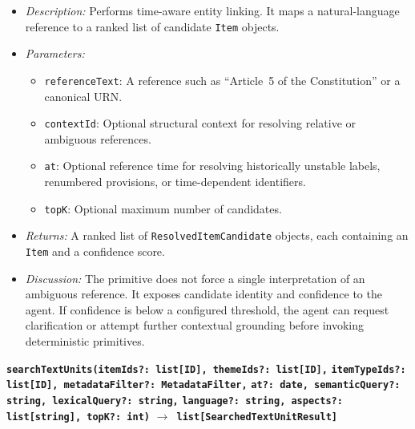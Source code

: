 \documentclass[11pt]{article}
\begin{document}
\begin{itemize}
    \item \textit{Description:} Performs time-aware entity linking. It maps a natural-language reference to a ranked list of candidate \texttt{Item} objects.
    \item \textit{Parameters:}
    \begin{itemize}
        \item \texttt{referenceText}: A reference such as ``Article~5 of the Constitution'' or a canonical URN.
        \item \texttt{contextId}: Optional structural context for resolving relative or ambiguous references.
        \item \texttt{at}: Optional reference time for resolving historically unstable labels, renumbered provisions, or time-dependent identifiers.
        \item \texttt{topK}: Optional maximum number of candidates.
    \end{itemize}
    \item \textit{Returns:} A ranked list of \texttt{ResolvedItemCandidate} objects, each containing an \texttt{Item} and a confidence score.
    \item \textit{Discussion:} The primitive does not force a single interpretation of an ambiguous reference. It exposes candidate identity and confidence to the agent. If confidence is below a configured threshold, the agent can request clarification or attempt further contextual grounding before invoking deterministic primitives.
\end{itemize}

\vspace{0.3cm}
\noindent\textbf{\texttt{searchTextUnits(itemIds?: list[ID], themeIds?: list[ID],}} \newline
\textbf{\texttt{itemTypeIds?: list[ID], metadataFilter?: MetadataFilter,}} \newline
\textbf{\texttt{at?: date, semanticQuery?: string, lexicalQuery?: string,}} \newline
\textbf{\texttt{language?: string, aspects?: list[string], topK?: int)}} \newline
\textbf{\texttt{$\rightarrow$ list[SearchedTextUnitResult]}}
\end{document}
